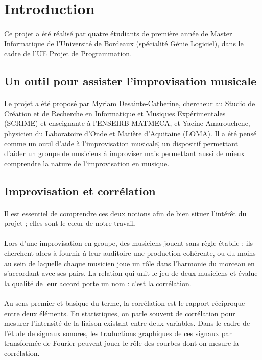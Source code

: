 
\section{Introduction}
\paragraph{}
Ce projet a été réalisé par quatre étudiants de première année de
Master Informatique de l'Université de Bordeaux (spécialité Génie
Logiciel), dans le cadre de l'UE Projet de Programmation.

\subsection{Un outil pour assister l'improvisation musicale}
\paragraph{}
Le projet a été proposé par Myriam Desainte-Catherine, chercheur au
Studio de Création et de Recherche en Informatique et Musiques
Expérimentales (SCRIME) et enseignante à l'ENSEIRB-MATMECA, et Yacine
Amarouchene, physicien du Laboratoire d'Onde et Matière d'Aquitaine
(LOMA). Il a été pensé comme un outil d'aide à \"l'improvisation
musicale\", un dispositif permettant d'aider un groupe de musiciens à
improviser mais permettant aussi de mieux comprendre la nature de
l'improvisation en musique.

\subsection{Improvisation et corrélation}
\paragraph{}
Il est essentiel de comprendre ces deux notions afin de bien situer
l'intérêt du projet ; elles sont le c\oe ur de notre travail.
\paragraph{}
Lors d'une improvisation en groupe, des musiciens jouent sans règle
établie ; ils cherchent alors à fournir à leur auditoire une
production cohérente, ou du moins au sein de laquelle chaque musicien
joue un rôle dans l'harmonie du morceau en s'accordant avec ses
pairs. La relation qui unit le jeu de deux musiciens et évalue la
qualité de leur accord porte un nom : c'est la corrélation.
\paragraph{}
Au sens premier et basique du terme, la corrélation est le rapport
réciproque entre deux éléments. En statistiques, on parle souvent de
corrélation pour mesurer l'intensité de la liaison existant entre deux
variables. Dans le cadre de l'étude de signaux sonores, les
traductions graphiques de ces signaux par transformée de Fourier
peuvent jouer le rôle des courbes dont on mesure la corrélation. \\
